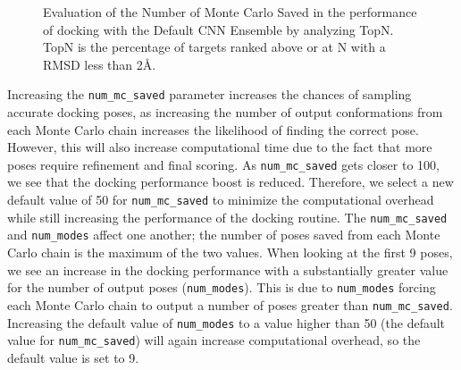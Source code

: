 \documentclass[linenumbers,doublespacing]{bmcart}
\begin{document}
\begin{figure}[tbh]
	\caption{Evaluation of the Number of Monte Carlo Saved in the performance of docking with the Default CNN Ensemble by analyzing TopN. TopN is the percentage of targets ranked above or at N with a RMSD less than 2{\AA}.}
	\label{fig:mcsaved}
\end{figure}    

Increasing the \texttt{num\_mc\_saved} parameter increases the chances of sampling accurate docking poses, as increasing the number of output conformations from each Monte Carlo chain increases the likelihood of finding the correct pose. However, this will also increase computational time due to the fact that more poses require refinement and final scoring. As \texttt{num\_mc\_saved} gets closer to 100, we see that the docking performance boost is reduced. Therefore, we select a new default value of 50 for \texttt{num\_mc\_saved} to minimize the computational overhead while still increasing the performance of the docking routine. The \texttt{num\_mc\_saved} and \texttt{num\_modes} affect one another; the number of poses saved from each Monte Carlo chain is the maximum of the two values. When looking at the first 9 poses, we see an increase in the docking performance with a substantially greater value for the number of output poses (\texttt{num\_modes}). This is due to \texttt{num\_modes} forcing each Monte Carlo chain to output a number of poses greater than \texttt{num\_mc\_saved}. Increasing the default value of \texttt{num\_modes} to a value higher than 50 (the default value for \texttt{num\_mc\_saved}) will again increase computational overhead, so the default value is set to 9. 
\end{document}
